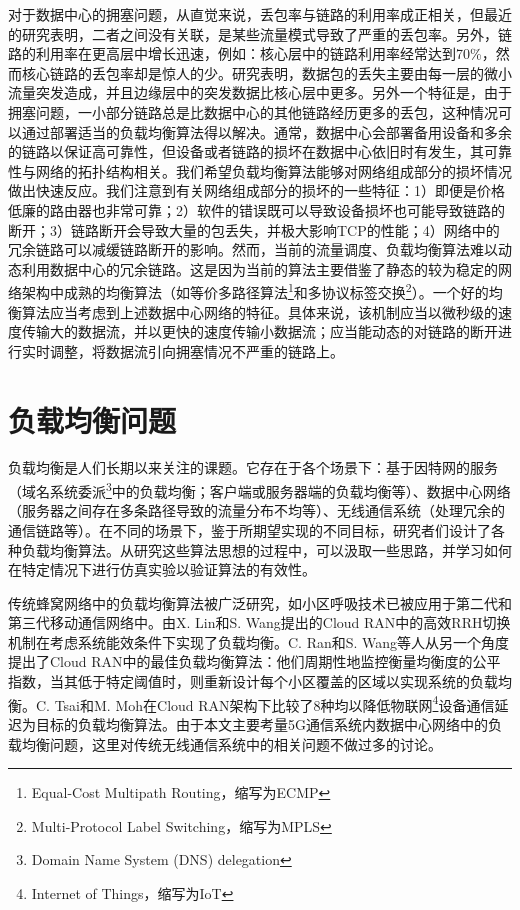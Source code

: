 对于数据中心的拥塞问题，从直觉来说，丢包率与链路的利用率成正相关，但最近的研究表明，二者之间没有关联，是某些流量模式导致了严重的丢包率\cite{zhang2011modeling}。另外，链路的利用率在更高层中增长迅速\cite{benson2010under,benson2010network}，例如：核心层中的链路利用率经常达到70\%，然而核心链路的丢包率却是惊人的少\cite{benson2010under}。研究表明，数据包的丢失主要由每一层的微小流量突发造成，并且边缘层中的突发数据比核心层中更多。另外一个特征是，由于拥塞问题，一小部分链路总是比数据中心的其他链路经历更多的丢包，这种情况可以通过部署适当的负载均衡算法得以解决。通常，数据中心会部署备用设备和多余的链路以保证高可靠性，但设备或者链路的损坏在数据中心依旧时有发生，其可靠性与网络的拓扑结构相关。我们希望负载均衡算法能够对网络组成部分的损坏情况做出快速反应。我们注意到有关网络组成部分的损坏的一些特征：1）即便是价格低廉的路由器也非常可靠；2）软件的错误既可以导致设备损坏也可能导致链路的断开；3）链路断开会导致大量的包丢失，并极大影响TCP的性能；4）网络中的冗余链路可以减缓链路断开的影响。然而，当前的流量调度、负载均衡算法难以动态利用数据中心的冗余链路。这是因为当前的算法主要借鉴了静态的较为稳定的网络架构中成熟的均衡算法（如等价多路径算法\footnote{Equal-Cost Multipath Routing，缩写为ECMP}和多协议标签交换\footnote{Multi-Protocol Label Switching，缩写为MPLS}）。一个好的均衡算法应当考虑到上述数据中心网络的特征。具体来说，该机制应当以微秒级的速度传输大的数据流，并以更快的速度传输小数据流；应当能动态的对链路的断开进行实时调整，将数据流引向拥塞情况不严重的链路上。

\section{负载均衡问题}

负载均衡是人们长期以来关注的课题。它存在于各个场景下：基于因特网的服务\cite{hong2006dns}（域名系统委派\footnote{Domain Name System (DNS) delegation}中的负载均衡；客户端或服务器端的负载均衡等）、数据中心网络\cite{alizadeh2014CONGA}（服务器之间存在多条路径导致的流量分布不均等）、无线通信系统（处理冗余的通信链路等）。在不同的场景下，鉴于所期望实现的不同目标，研究者们设计了各种负载均衡算法。从研究这些算法思想的过程中，可以汲取一些思路，并学习如何在特定情况下进行仿真实验以验证算法的有效性。

传统蜂窝网络中的负载均衡算法被广泛研究，如小区呼吸技术\cite{niu2010cell}已被应用于第二代和第三代移动通信网络中。由X. Lin和S. Wang提出的Cloud RAN中的高效RRH切换机制在考虑系统能效条件下\cite{lin2010efficient}实现了负载均衡。C. Ran和S. Wang等人从另一个角度提出了Cloud RAN中的最佳负载均衡算法：他们周期性地监控衡量均衡度的公平指数，当其低于特定阈值时，则重新设计每个小区覆盖的区域以实现系统的负载均衡\cite{ran2015optimal}。C. Tsai和M. Moh在Cloud RAN架构下比较了8种均以降低物联网\footnote{Internet of Things，缩写为IoT}设备通信延迟为目标\cite{tsai2017load}的负载均衡算法。由于本文主要考量5G通信系统内数据中心网络中的负载均衡问题，这里对传统无线通信系统中的相关问题不做过多的讨论。

